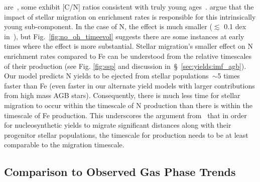 \documentclass[ms.tex]{subfiles}
\begin{document}
are~\citep{Jofre2016, Yong2016, Izzard2018, SilvaAguirre2018, Miglio2021}, some
exhibit [C/N] ratios consistent with truly young ages~\citep{Hekker2019}.
\citet{Johnson2021} argue that the impact of stellar migration on enrichment
rates is responsible for this intrinsically young sub-component.
In the case of N, the effect is much smaller ($\lesssim$ 0.1 dex in~\no),
but Fig.~\ref{fig:no_oh_timeevol} suggests there are some instances at early
times where the effect is more substantial.
Stellar migration's smaller effect on N enrichment rates compared to Fe can be
understood from the relative timescales of their production (see Fig.
\ref{fig:ssp} and discussion in~\S~\ref{sec:yields:imf_agb}).
Our model predicts N yields to be ejected from stellar populations~$\sim$5
times faster than Fe (even faster in our alternate yield models with larger
contributions from high mass AGB stars).
Consequently, there is much less time for stellar migration to occur within the
timescale of N production than there is within the timescale of Fe production.
This underscores the argument from~\citet{Johnson2021} that in order for
nucleosynthetic yields to migrate significant distances along with their
progenitor stellar populations, the timescale for production needs to be at
least comparable to the migration timescale.

\subsection{Comparison to Observed Gas Phase Trends}
\label{sec:results:yields}
\end{document}
